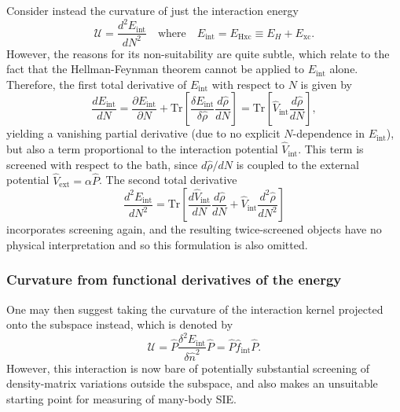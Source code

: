Consider instead the curvature of 
just the interaction energy   
%
\begin{equation}
\mathcal{U}=\frac{d^2 E_\textrm{int}}{ d  N^{2}}
\quad\mbox{where}\quad
E_\textrm{int}=E_\textrm{Hxc}\equiv E_H+E_\textrm{xc}.
\end{equation}
%
However, the reasons for its 
non-suitability are quite subtle, 
which relate to the fact that the Hellman-Feynman theorem 
cannot be applied to $E_\textrm{int}$ alone.
%
Therefore, the first total derivative of $E_\textrm{int}$ 
with respect to $N$ is given by 
%
\begin{equation}
\frac{dE_\textrm{int}}{dN} = \frac{\partial E_\textrm{int}}{\partial N} 
+ \textrm{Tr}\left[ \frac{\delta E_\textrm{int}}{\delta \hat{\rho}} \frac{d \hat{\rho}}{ d N} \right]
= \textrm{Tr}\left[ \hat{V}_\textrm{int}\frac{d \hat{\rho}}{ d N} \right],
\end{equation}
%
yielding a vanishing partial derivative 
(due to no explicit $N$-dependence in $E_\textrm{int}$), 
but also a term proportional to 
the interaction potential 
$\hat{V}_\textrm{int}$.
%
This term is screened with respect to the bath, 
since 
$d \hat{\rho} / d N$ 
is coupled to the external potential
$\hat{V}_\textrm{ext} = \alpha \hat{P}$.
%
The second total derivative
%
\begin{equation}
\frac{d^2 E_\textrm{int}}{dN^2}=\textrm{Tr}\left[\frac{d\hat{V}_\textrm{int}}{dN}\frac{d \hat{\rho}}{d N}+\hat{V}_\textrm{int}\frac{d^2 \hat{\rho}}{d N^2}\right]
\end{equation}
%
incorporates screening again, 
and the resulting twice-screened objects 
have no physical interpretation 
and so this formulation is also omitted.

\subsubsection{Curvature from functional derivatives of the energy} 

One may then suggest taking the curvature of the 
interaction kernel projected onto the subspace instead, 
which is denoted by 
%
\begin{equation}
\mathcal{U} = \hat{P}\frac{\delta^2 E_\textrm{int}}{\delta \hat{n}^{ 2}} \hat{P}  = \hat{P} \hat{f}_\textrm{int} \hat{P}.
\end{equation}
%
However, 
this interaction is now bare of potentially 
substantial screening of density-matrix variations 
outside the subspace, 
and also makes an unsuitable 
starting point for measuring of many-body SIE.
%


